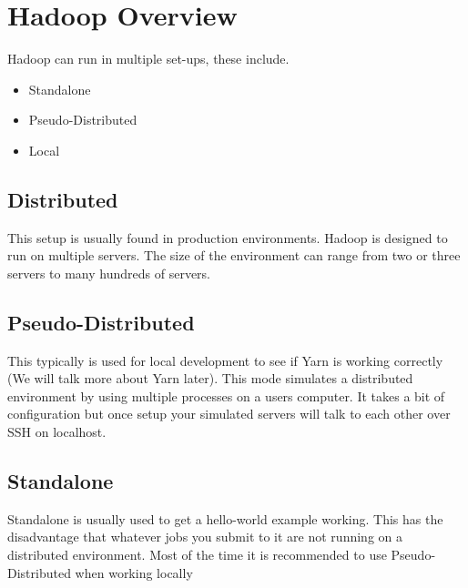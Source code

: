 \section{Hadoop Overview}

Hadoop can run in multiple set-ups, these include. 

\begin{itemize}
\item Standalone
\item Pseudo-Distributed
\item Local
\end{itemize}

\subsection{Distributed}

This setup is usually found in production environments. Hadoop is designed to run on multiple servers. The size of the environment can range from two or three servers to many hundreds of servers. 

\subsection{Pseudo-Distributed}

This typically is used for local development to see if Yarn is working correctly (We will talk more about Yarn later). This mode simulates a distributed environment by using multiple processes on a users computer. It takes a bit of configuration but once setup your simulated servers will talk to each other over SSH on localhost. 

\subsection{Standalone}

Standalone is usually used to get a hello-world example working. This has the disadvantage that whatever jobs you submit to it are not running on a distributed environment. Most of the time it is recommended to use Pseudo-Distributed when working locally

